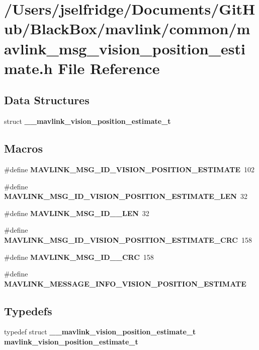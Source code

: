 \section{/\+Users/jselfridge/\+Documents/\+Git\+Hub/\+Black\+Box/mavlink/common/mavlink\+\_\+msg\+\_\+vision\+\_\+position\+\_\+estimate.h File Reference}
\label{mavlink__msg__vision__position__estimate_8h}
\subsection*{Data Structures}
\begin{DoxyCompactItemize}
\item 
struct \textbf{ \+\_\+\+\_\+mavlink\+\_\+vision\+\_\+position\+\_\+estimate\+\_\+t}
\end{DoxyCompactItemize}
\subsection*{Macros}
\begin{DoxyCompactItemize}
\item 
\#define \textbf{ M\+A\+V\+L\+I\+N\+K\+\_\+\+M\+S\+G\+\_\+\+I\+D\+\_\+\+V\+I\+S\+I\+O\+N\+\_\+\+P\+O\+S\+I\+T\+I\+O\+N\+\_\+\+E\+S\+T\+I\+M\+A\+TE}~102
\item 
\#define \textbf{ M\+A\+V\+L\+I\+N\+K\+\_\+\+M\+S\+G\+\_\+\+I\+D\+\_\+\+V\+I\+S\+I\+O\+N\+\_\+\+P\+O\+S\+I\+T\+I\+O\+N\+\_\+\+E\+S\+T\+I\+M\+A\+T\+E\+\_\+\+L\+EN}~32
\item 
\#define \textbf{ M\+A\+V\+L\+I\+N\+K\+\_\+\+M\+S\+G\+\_\+\+I\+D\+\_\+\_\+\+L\+EN}~32
\item 
\#define \textbf{ M\+A\+V\+L\+I\+N\+K\+\_\+\+M\+S\+G\+\_\+\+I\+D\+\_\+\+V\+I\+S\+I\+O\+N\+\_\+\+P\+O\+S\+I\+T\+I\+O\+N\+\_\+\+E\+S\+T\+I\+M\+A\+T\+E\+\_\+\+C\+RC}~158
\item 
\#define \textbf{ M\+A\+V\+L\+I\+N\+K\+\_\+\+M\+S\+G\+\_\+\+I\+D\+\_\+\_\+\+C\+RC}~158
\item 
\#define \textbf{ M\+A\+V\+L\+I\+N\+K\+\_\+\+M\+E\+S\+S\+A\+G\+E\+\_\+\+I\+N\+F\+O\+\_\+\+V\+I\+S\+I\+O\+N\+\_\+\+P\+O\+S\+I\+T\+I\+O\+N\+\_\+\+E\+S\+T\+I\+M\+A\+TE}
\end{DoxyCompactItemize}
\subsection*{Typedefs}
\begin{DoxyCompactItemize}
\item 
typedef struct \textbf{ \+\_\+\+\_\+mavlink\+\_\+vision\+\_\+position\+\_\+estimate\+\_\+t} \textbf{ mavlink\+\_\+vision\+\_\+position\+\_\+estimate\+\_\+t}
\end{DoxyCompactItemize}


